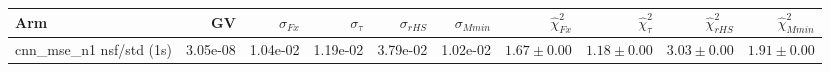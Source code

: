 \begin{tabular}{lrrrrrrrrr}
\toprule
Arm & GV & $\sigma_{Fx}$ & $\sigma_{\tau}$ & $\sigma_{rHS}$ & $\sigma_{Mmin}$ & $\hat\chi^2_{Fx}$ & $\hat\chi^2_{\tau}$ & $\hat\chi^2_{rHS}$ & $\hat\chi^2_{Mmin}$ \\
\midrule
cnn_mse_n1 nsf/std (1s) & 3.05e-08 & 1.04e-02 & 1.19e-02 & 3.79e-02 & 1.02e-02 & $1.67\pm0.00$ & $1.18\pm0.00$ & $3.03\pm0.00$ & $1.91\pm0.00$ \\
\bottomrule
\end{tabular}
